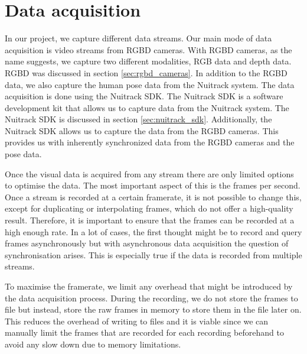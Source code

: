 \section{Data acquisition}
\label{sec:data_acquisition}

In our project, we capture different data streams. Our main mode of data acquisition is video streams from RGBD cameras. With RGBD cameras, as the name suggests, we capture two different modalities, RGB data and depth data. RGBD was discussed in section \ref{sec:rgbd_cameras}. In addition to the RGBD data, we also capture the human pose data from the Nuitrack system. The data acquisition is done using the Nuitrack SDK. The Nuitrack SDK is a software development kit that allows us to capture data from the Nuitrack system. The Nuitrack SDK is discussed in section \ref{sec:nuitrack_sdk}. Additionally, the Nuitrack SDK allows us to capture the data from the RGBD cameras. This provides us with inherently synchronized data from the RGBD cameras and the pose data.

Once the visual data is acquired from any stream there are only limited options to optimise the data. The most important aspect of this is the frames per second. Once a stream is recorded at a certain framerate, it is not possible to change this, except for duplicating or interpolating frames, which do not offer a high-quality result. Therefore, it is important to ensure that the frames can be recorded at a high enough rate. In a lot of cases, the first thought might be to record and query frames asynchronously but with asynchronous data acquisition the question of synchronisation arises. This is especially true if the data is recorded from multiple streams.

To maximise the framerate, we limit any overhead that might be introduced by the data acquisition process. During the recording, we do not store the frames to file but instead, store the raw frames in memory to store them in the file later on. This reduces the overhead of writing to files and it is viable since we can manually limit the frames that are recorded for each recording beforehand to avoid any slow down due to memory limitations.
